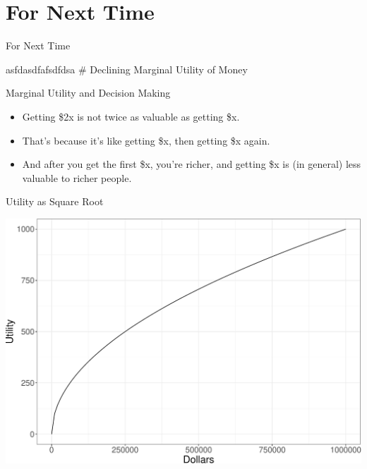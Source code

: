 \documentclass[
  ignorenonframetext,
]{beamer}
\providecommand{\tightlist}{%
  \setlength{\itemsep}{0pt}\setlength{\parskip}{0pt}}
\renewcommand{\,}{\text{, }}
\begin{document}
\hypertarget{for-next-time-8}{%
\section{For Next Time}\label{for-next-time-8}}

\begin{frame}{For Next Time}
\protect\hypertarget{for-next-time-9}{}

asfdasdfafsdfdsa \# Declining Marginal Utility of Money

\end{frame}

\begin{frame}{Marginal Utility and Decision Making}
\protect\hypertarget{marginal-utility-and-decision-making-1}{}

\begin{itemize}
\tightlist
\item
  Getting \$2x is not twice as valuable as getting \$x.
\item
  That's because it's like getting \$x, then getting \$x again.
\item
  And after you get the first \$x, you're richer, and getting \$x is (in
  general) less valuable to richer people.
\end{itemize}

\end{frame}

\begin{frame}{Utility as Square Root}
\protect\hypertarget{utility-as-square-root}{}

\begin{center}


\includegraphics[width=0.9\linewidth]{Lecture_3_4_all_files/figure-beamer/unnamed-chunk-1-1} 

\end{center}

\end{frame}
\end{document}
